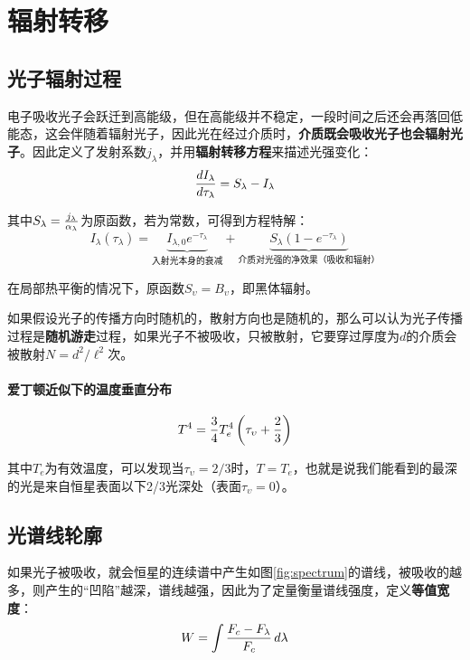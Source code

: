 \documentclass[openany]{ctexbook}
\begin{document}
\section{辐射转移}
\subsection{光子辐射过程}
电子吸收光子会跃迁到高能级，但在高能级并不稳定，一段时间之后还会再落回低能态，这会伴随着辐射光子，因此光在经过介质时，\textbf{介质既会吸收光子也会辐射光子}。因此定义了发射系数$j_\lambda$，并用\textbf{辐射转移方程}来描述光强变化：
\begin{equation}
  {dI_\lambda \over d\tau_\lambda}=S_\lambda-I_\lambda
\end{equation}

其中$S_\lambda={j_\lambda\over \alpha_\lambda}$为原函数，若为常数，可得到方程特解：
\begin{equation}
  I_\lambda(\tau_\lambda)=\underbrace{I_{\lambda,0}e^{-\tau_\lambda}}_\text{入射光本身的衰减}+\underbrace{S_\lambda(1-e^{-\tau_\lambda})}_\text{介质对光强的净效果（吸收和辐射）}
\end{equation}

在局部热平衡的情况下，原函数$S_\upsilon=B_\upsilon$，即黑体辐射。

如果假设光子的传播方向时随机的，散射方向也是随机的，那么可以认为光子传播过程是\textbf{随机游走}过程，如果光子不被吸收，只被散射，它要穿过厚度为$d$的介质会被散射$N=d^2/\ell^2$次。

\paragraph{爱丁顿近似下的温度垂直分布}
\begin{equation}
  T^4={3\over 4}T_e^4\left(\tau_\upsilon+{2\over3}\right)
\end{equation}

其中$T_e$为有效温度，可以发现当$\tau_\upsilon=2/3$时，$T=T_e$，也就是说我们能看到的最深的光是来自恒星表面以下2/3光深处（表面$\tau_\upsilon=0$）。

\subsection{光谱线轮廓}
如果光子被吸收，就会恒星的连续谱中产生如图\ref{fig:spectrum}的谱线，被吸收的越多，则产生的``凹陷''越深，谱线越强，因此为了定量衡量谱线强度，定义\textbf{等值宽度}：
\begin{equation}
  W=\int{\displaystyle F_c-F_\lambda \over \displaystyle F_c}\,d\lambda
\end{equation}
\end{document}

